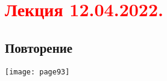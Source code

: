\documentclass[main.tex]{subfiles}
\begin{document}
\section{\textcolor{red}{Лекция 12.04.2022.}}

\subsection{Повторение}
\texttt{[image: page93]}






\end{document}
